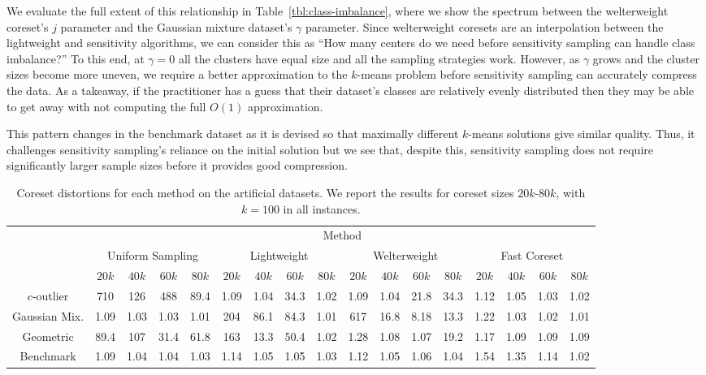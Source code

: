 We evaluate the full extent of this relationship in Table~\ref{tbl:class-imbalance}, where we show the spectrum between the welterweight coreset's $j$ parameter
and the Gaussian mixture dataset's $\gamma$ parameter. Since welterweight coresets are an interpolation between the lightweight and sensitivity algorithms, we
can consider this as ``How many centers do we need before sensitivity sampling can handle class imbalance?'' To this end, at $\gamma = 0$ all the clusters have
equal size and all the sampling strategies work. However, as $\gamma$ grows and the cluster sizes become more uneven, we require a better approximation to the
$k$-means problem before sensitivity sampling can accurately compress the data. As a takeaway, if the practitioner has a guess that their dataset's classes are
relatively evenly distributed then they may be able to get away with not computing the full $O(1)$ approximation.

This pattern changes in the benchmark dataset as it is devised so that maximally different $k$-means solutions give similar quality. Thus, it challenges
sensitivity sampling's reliance on the initial solution but we see that, despite this, sensitivity sampling does not require significantly larger sample sizes
before it provides good compression.

\begin{table*}[htbp]
    \centering
    \small
    \begin{tabular}{|c|cccc|cccc|cccc|cccc|}
        \hline
        & \multicolumn{16}{c|}{Method} \\
        \cline{2-17} & \multicolumn{4}{c|}{Uniform Sampling} & \multicolumn{4}{c|}{Lightweight} & \multicolumn{4}{c|}{Welterweight} & \multicolumn{4}{c|}{Fast Coreset} \\
        & $20k$ & $40k$ & $60k$ & $80k$ & $20k$ & $40k$ & $60k$ & $80k$ & $20k$ & $40k$ & $60k$ & $80k$ & $20k$ & $40k$ & $60k$ & $80k$ \\
        \cline{2-17}
        $c$-outlier & 710 & 126 & 488 & 89.4 & 1.09 & 1.04 & 34.3 & 1.02 & 1.09 & 1.04 & 21.8 & 34.3 & 1.12 & 1.05 & 1.03 & 1.02 \\
        Gaussian Mix. & 1.09 & 1.03 & 1.03 & 1.01 & 204 & 86.1 & 84.3 & 1.01 & 617 & 16.8 & 8.18 & 13.3 & 1.22 & 1.03 & 1.02 & 1.01 \\
        Geometric & 89.4 & 107 & 31.4 & 61.8 & 163 & 13.3 & 50.4 & 1.02 & 1.28 & 1.08 & 1.07 & 19.2 & 1.17 & 1.09 & 1.09 & 1.09 \\
        Benchmark & 1.09 & 1.04 & 1.04 & 1.03 & 1.14 & 1.05 & 1.05 & 1.03 & 1.12 & 1.05 & 1.06 & 1.04 & 1.54 & 1.35 & 1.14 & 1.02 \\
        \hline
    \end{tabular}
    \caption{Coreset distortions for each method on the artificial datasets. We report the results for coreset sizes $20k$-$80k$, with $k=100$ in all
    instances.}
    \label{tbl:artificial_failure}
\end{table*}

